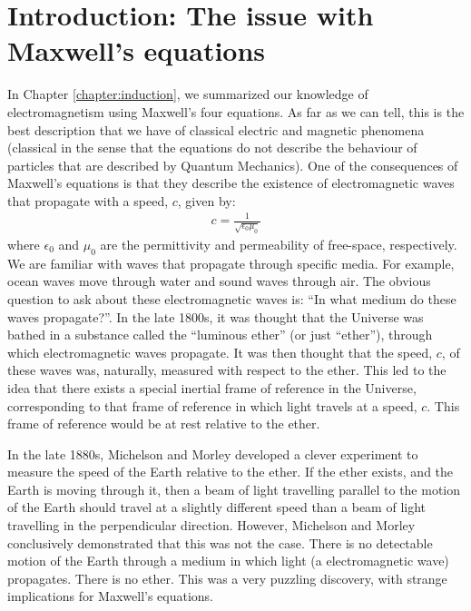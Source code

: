 \section{Introduction: The issue with Maxwell's equations}
In Chapter \ref{chapter:induction}, we summarized our knowledge of electromagnetism using Maxwell's four equations. As far as we can tell, this is the best description that we have of classical electric and magnetic phenomena (classical in the sense that the equations do not describe the behaviour of particles that are described by Quantum Mechanics). One of the consequences of Maxwell's equations is that they describe the existence of electromagnetic waves that propagate with a speed, $c$, given by:
\begin{align*}
c = \frac{1}{\sqrt{\epsilon_0\mu_0}}
\end{align*} 
where $\epsilon_0$ and $\mu_0$ are the permittivity and permeability of free-space, respectively. We are familiar with waves that propagate through specific media. For example, ocean waves move through water and sound waves through air. The obvious question to ask about these electromagnetic waves is: ``In what medium do these waves propagate?''. In the late 1800s, it was thought that the Universe was bathed in a substance called the ``luminous ether'' (or just ``ether''), through which electromagnetic waves propagate. It was then thought that the speed, $c$, of these waves was, naturally, measured with respect to the ether. This led to the idea that there exists a special inertial frame of reference in the Universe, corresponding to that frame of reference in which light travels at a speed, $c$. This frame of reference would be at rest relative to the ether.

In the late 1880s, Michelson and Morley developed a clever experiment to measure the speed of the Earth relative to the ether. If the ether exists, and the Earth is moving through it, then a beam of light travelling parallel to the motion of the Earth should travel at a slightly different speed than a beam of light travelling in the perpendicular direction. However, Michelson and Morley conclusively demonstrated that this was not the case. There is no detectable motion of the Earth through a medium in which light (a electromagnetic wave) propagates. There is no ether. This was a very puzzling discovery, with strange implications for Maxwell's equations. 

